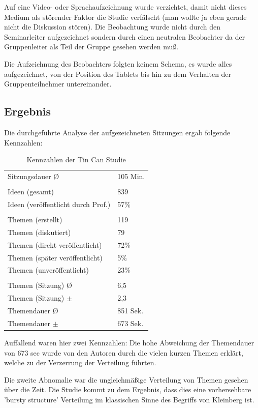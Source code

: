 Auf eine Video- oder Sprachaufzeichnung wurde verzichtet, damit nicht dieses
Medium als störender Faktor die Studie verfälscht (man wollte ja eben gerade
nicht die Diskussion stören). Die Beobachtung wurde nicht durch den
Seminarleiter aufgezeichnet sondern durch einen neutralen Beobachter da der
Gruppenleiter als Teil der Gruppe gesehen werden muß.

Die Aufzeichnung des Beobachters folgten keinem Schema, es wurde alles
aufgezeichnet, von der Position des Tablets bis hin zu dem Verhalten der
Gruppenteilnehmer untereinander.


\subsection{Ergebnis}
Die durchgeführte Analyse der aufgezeichneten Sitzungen ergab folgende Kennzahlen:

\begin{table}[htp]
  \begin{tabular}{ l  l }
    Sitzungsdauer \O & 105 Min.\\
    \\
    Ideen  (gesamt) &  839 \\
    Ideen  (veröffentlicht durch Prof.) & 57\% \\
    \\
    Themen (erstellt) & 119 \\
    Themen (diskutiert) & 79 \\
    Themen (direkt veröffentlicht) & 72\% \\
    Themen (später veröffentlicht) & 5\% \\ 
    Themen (unveröffentlicht) & 23\% \\
    \\
    Themen (Sitzung) \O & 6,5 \\
    Themen (Sitzung) $\pm$ & 2,3 \\
    Themendauer \O & 851 Sek. \\
    Themendauer $\pm$ & 673 Sek. \\
  \end{tabular}
  \caption{Kennzahlen der Tin Can Studie}
\end{table}

Auffallend waren hier zwei Kennzahlen: Die hohe Abweichung der Themendauer von
673  sec wurde von den Autoren durch die vielen kurzen Themen erklärt, welche zu
der Verzerrung der Verteilung führten.

Die zweite Abnomalie war die ungleichmäßige Verteilung von Themen gesehen über
die Zeit. Die Studie kommt zu dem Ergebnis, dass dies eine vorhersehbare 'bursty
structure' Verteilung im klassischen Sinne des Begriffs von Kleinberg ist.

